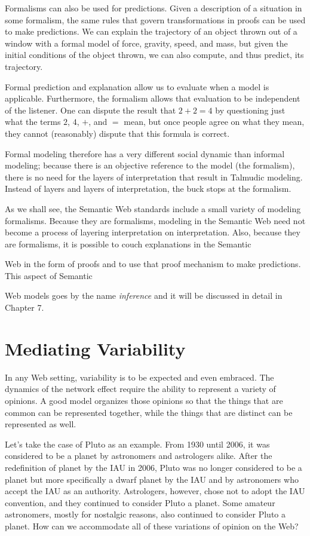 Formalisms can also be used for predictions. Given a description of a
situation in some formalism, the same rules that govern transformations
in proofs can be used to make predictions. We can explain the trajectory
of an object thrown out of a window with a formal model of force,
gravity, speed, and mass, but given the initial conditions of the object
thrown, we can also compute, and thus predict, its trajectory.

Formal prediction and explanation allow us to evaluate when a model is
applicable. Furthermore, the formalism allows that evaluation to be
independent of the listener. One can dispute the result that 
$2 + 2 = 4$ by questioning just what the terms $2$, $4$, $+$, and
$=$ mean, but once people agree on what they mean, they cannot
(reasonably) dispute that this formula is correct.

Formal modeling therefore has a very different social dynamic than
informal modeling; because there is an objective reference to the model
(the formalism), there is no need for the layers of interpretation that
result in Talmudic modeling. Instead of layers and layers of
interpretation, the buck stops at the formalism.

As we shall see, the Semantic Web standards include a small variety of
modeling formalisms. Because they are formalisms, modeling in the
Semantic Web need not become a process of layering interpretation on
interpretation. Also, because they are formalisms, it is possible to
couch explanations in the Semantic

Web in the form of proofs and to use that proof mechanism to make
predictions. This aspect of Semantic

Web models goes by the name \emph{inference} and it will be discussed in
detail in Chapter 7.

\section{Mediating Variability}

In any Web setting, variability is to be expected and even embraced. The
dynamics of the network effect require the ability to represent a
variety of opinions. A good model organizes those opinions so that the
things that are common can be represented together, while the things
that are distinct can be represented as well.

Let's take the case of Pluto as an example. From 1930 until 2006, it was
considered to be a planet by astronomers and astrologers alike. After
the redefinition of planet by the IAU in 2006, Pluto was no longer
considered to be a planet but more specifically a dwarf planet by the
IAU and by astronomers who accept the IAU as an authority. Astrologers,
however, chose not to adopt the IAU convention, and they continued to
consider Pluto a planet. Some amateur astronomers, mostly for nostalgic
reasons, also continued to consider Pluto a planet. How can we
accommodate all of these variations of opinion on the Web?

